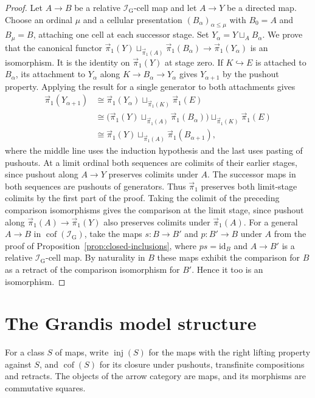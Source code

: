 \documentclass[12pt,a4paper]{amsart}
\theoremstyle{definition}
\renewcommand{\leq}{\leqslant}
\renewcommand{\vec}{\overrightarrow}
\newcommand{\I}{\mathcal I_{\mathrm G}}
\newcommand{\PiC}{\vec{\pi}_1}
\begin{document}
\begin{proof}
Let $A\to B$ be a relative $\I$-cell map and let $A\to Y$ be a directed map. Choose an ordinal $\mu$ and a cellular presentation $(B_\alpha)_{\alpha\leq\mu}$ with $B_0=A$ and $B_\mu=B$, attaching one cell at each successor stage. Set $Y_\alpha=Y\sqcup_A B_\alpha$. We prove that the canonical functor $\PiC(Y)\sqcup_{\PiC(A)}\PiC(B_\alpha)\to\PiC(Y_\alpha)$ is an isomorphism. It is the identity on $\PiC(Y)$ at stage zero. If $K\hookrightarrow E$ is attached to $B_\alpha$, its attachment to $Y_\alpha$ along $K\to B_\alpha\to Y_\alpha$ gives $Y_{\alpha+1}$ by the pushout property. Applying the result for a single generator to both attachments gives
\[
\begin{aligned}
 \PiC(Y_{\alpha+1})
 &\cong \PiC(Y_\alpha)\sqcup_{\PiC(K)}\PiC(E)\\
 &\cong \bigl(\PiC(Y)\sqcup_{\PiC(A)}\PiC(B_\alpha)\bigr)\sqcup_{\PiC(K)}\PiC(E)\\
 &\cong \PiC(Y)\sqcup_{\PiC(A)}\PiC(B_{\alpha+1}),
\end{aligned}
\]
where the middle line uses the induction hypothesis and the last uses pasting of pushouts. At a limit ordinal both sequences are colimits of their earlier stages, since pushout along $A\to Y$ preserves colimits under $A$. The successor maps in both sequences are pushouts of generators. Thus $\PiC$ preserves both limit-stage colimits by the first part of the proof. Taking the colimit of the preceding comparison isomorphisms gives the comparison at the limit stage, since pushout along $\PiC(A)\to\PiC(Y)$ also preserves colimits under $\PiC(A)$. For a general $A\to B$ in $\operatorname{cof}(\I)$, take the maps $s\colon B\to B'$ and $p\colon B'\to B$ under $A$ from the proof of Proposition~\ref{prop:closed-inclusions}, where $ps=\mathrm{id}_B$ and $A\to B'$ is a relative $\I$-cell map. By naturality in $B$ these maps exhibit the comparison for $B$ as a retract of the comparison isomorphism for $B'$. Hence it too is an isomorphism.
\end{proof}

\section{The Grandis model structure}\label{sec:model}

For a class $S$ of maps, write $\operatorname{inj}(S)$ for the maps with the right lifting property against $S$, and $\operatorname{cof}(S)$ for its closure under pushouts, transfinite compositions and retracts. The objects of the arrow category are maps, and its morphisms are commutative squares.
\end{document}
